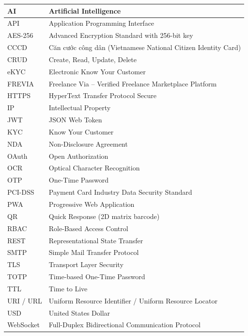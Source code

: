 \begin{longtable}{|L{3.5cm}|L{11.5cm}|}
AI & Artificial Intelligence \\ \hline
API & Application Programming Interface \\ \hline
AES-256 & Advanced Encryption Standard with 256-bit key \\ \hline
CCCD & {\selectfont Căn cước công dân} (Vietnamese National Citizen Identity Card) \\ \hline
CRUD & Create, Read, Update, Delete \\ \hline
eKYC & Electronic Know Your Customer \\ \hline
FREVIA & Freelance Via -- Verified Freelance Marketplace Platform \\ \hline
HTTPS & HyperText Transfer Protocol Secure \\ \hline
IP & Intellectual Property \\ \hline
JWT & JSON Web Token \\ \hline
KYC & Know Your Customer \\ \hline
NDA & Non-Disclosure Agreement \\ \hline
OAuth & Open Authorization \\ \hline
OCR & Optical Character Recognition \\ \hline
OTP & One-Time Password \\ \hline
PCI-DSS & Payment Card Industry Data Security Standard \\ \hline
PWA & Progressive Web Application \\ \hline
QR & Quick Response (2D matrix barcode) \\ \hline
RBAC & Role-Based Access Control \\ \hline
REST & Representational State Transfer \\ \hline
SMTP & Simple Mail Transfer Protocol \\ \hline
TLS & Transport Layer Security \\ \hline
TOTP & Time-based One-Time Password \\ \hline
TTL & Time to Live \\ \hline
URI / URL & Uniform Resource Identifier / Uniform Resource Locator \\ \hline
USD & United States Dollar \\ \hline
WebSocket & Full-Duplex Bidirectional Communication Protocol \\ \hline
\end{longtable}
\endgroup

\setcounter{table}{0}

\newpage
